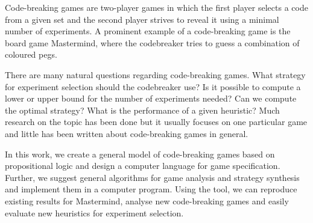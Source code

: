 \begin{ThesisAbstract}
Code-breaking games are two-player games in which the first player selects
  a code from a given set and the second player strives to reveal it using a
  minimal number of experiments.
A prominent example of a code-breaking game is the board game Mastermind,
  where the codebreaker tries to guess a combination of coloured pegs.

There are many natural questions regarding code-breaking games.
What strategy for experiment selection should the codebreaker use?
Is it possible to compute a lower or upper bound for the number of experiments needed?
Can we compute the optimal strategy?
What is the performance of a given heuristic?
Much research on the topic has been done but it usually focuses
  on one particular game and little has been written about code-breaking
  games in general.

In this work, we create a general model of code-breaking games
  based on propositional logic
  and design a computer language for game specification.
Further, we suggest general algorithms for game analysis and strategy synthesis
  and implement them in a computer program.
Using the tool, we can reproduce existing results for Mastermind,
  analyse new code-breaking games and easily evaluate new heuristics
  for experiment selection.
\end{ThesisAbstract}

\MainMatter
\setlength{\parindent}{0pt}

\setcounter{secnumdepth}{1}
\setcounter{tocdepth}{2}
\begin{spacing}{1.2} \normalsize
\tableofcontents
\end{spacing}










\pagestyle{plain}
\printbibliography[heading=bibintoc]




